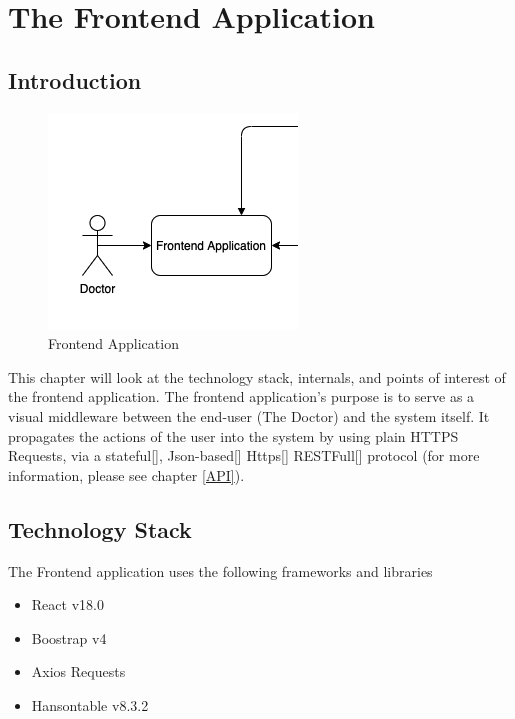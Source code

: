 \chapter{The Frontend Application}
\label{frontend}
	\section{Introduction}
		\begin{figure}[H]
			\iftrue
			\caption{Frontend Application}
			\centering
			\includegraphics[scale=0.5]{figures/frontend}
			\fi
		\end{figure}
		This chapter will look at the technology stack, internals, and points of interest of the frontend application. The frontend application's 
		purpose is to serve as a visual middleware between the end-user (The Doctor) and the system itself. It  propagates the actions of the user 
		into the system by using plain HTTPS Requests, via a stateful[\cite{session-rfc6265}], Json-based[\cite{json-rfc7159}] Https[\cite{rfc2818}]
		RESTFull[\cite{restful-rfc7231}] protocol (for more information, please see chapter \ref{API}).
	\section{Technology Stack}
		The Frontend application uses the following frameworks and libraries
		\begin{itemize}
			\item React v18.0
			\item Boostrap v4
			\item Axios Requests
			\item Hansontable v8.3.2
		\end{itemize}
